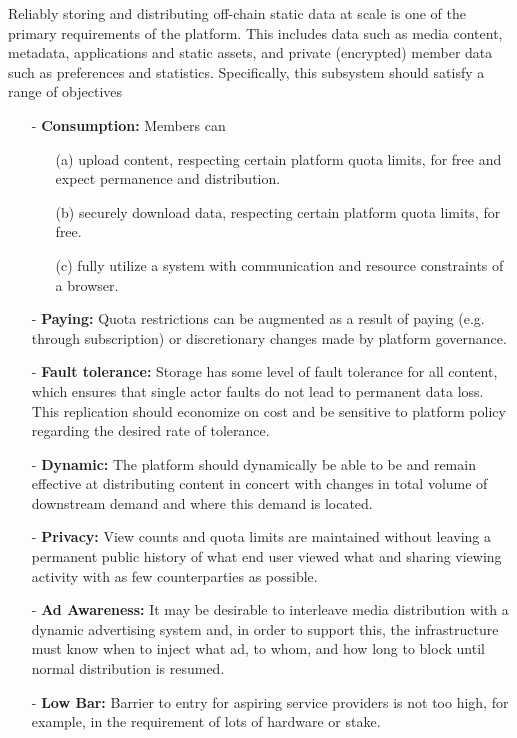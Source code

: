 \documentclass{article}
\begin{document}
Reliably storing and distributing off-chain static data at scale is one of the primary requirements of the platform. This includes data such as media content, metadata, applications and static assets, and private (encrypted) member data such as preferences and statistics. Specifically, this subsystem should satisfy a range of objectives

\begin{itemize}
  \item[-] \textbf{Consumption:} Members can

  \begin{itemize}
      \item[(a)] upload content, respecting certain platform quota limits, for free and expect permanence and distribution.

      \item[(b)] securely download data, respecting certain platform quota limits, for free.

      \item[(c)] fully utilize a system with communication and resource constraints of a browser.

  \end{itemize}

  \item[-] \textbf{Paying:} Quota restrictions can be augmented as a result of paying (e.g. through subscription) or discretionary changes made by platform governance.

  \item[-] \textbf{Fault tolerance:} Storage has some level of fault tolerance for all content, which ensures that single actor faults do not lead to permanent data loss. This replication should economize on cost and be sensitive to platform policy regarding the desired rate of tolerance.

  \item[-] \textbf{Dynamic:} The platform should dynamically be able to be and remain effective at distributing content in concert with changes in total volume of downstream demand and where this demand is located.

  \item[-] \textbf{Privacy:} View counts and quota limits are maintained without leaving a permanent public history of what end user viewed what and sharing viewing activity with as few counterparties as possible.

  \item[-] \textbf{Ad Awareness:} It may be desirable to interleave media distribution with a dynamic advertising system and, in order to support this, the infrastructure must know when to inject what ad, to whom, and how long to block until normal distribution is resumed.

  \item[-] \textbf{Low Bar:} Barrier to entry for aspiring service providers is not too high, for example, in the requirement of lots of hardware or stake.

\end{itemize}
\end{document}
